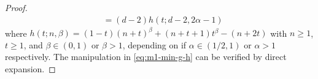 \documentclass[11pt]{article}
\begin{document}
\begin{proof}
\begin{equation}
\begin{aligned}
     &=(d-2)h(t;d-2,2\alpha-1)
\end{aligned}
\end{equation}
where $h(t;n,\beta)=(1-t)(n+t)^{\beta}+(n+t+1)t^{\beta}-(n+2t)$ with $n\geq 1$, $t\geq 1$, and $\beta \in (0,1)$ or $\beta>1$, depending on if $\alpha \in (1/2,1)$ or $\alpha>1$ respectively. The manipulation in \eqref{eq:m1-min-g-h} can be verified by direct expansion. 


\end{proof}
\end{document}
